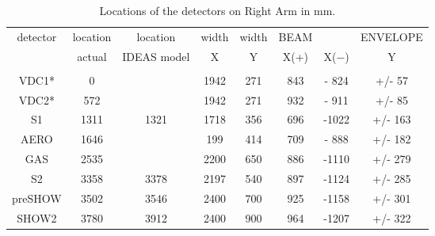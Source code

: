 \begin{table}[hptb]
\begin{center}
\begin{tabular}{cccccccc}
detector&location&  location& width &   width &      BEAM  &        & ENVELOPE \\
        & actual &IDEAS model&   X  &     Y   &      X(+)&  X($-$) &   Y\\  \hline
       &        &          &        &         &          &         &           \\  \hline    
VDC1*   &      0 &          &   1942 &    271  &     843    & - 824  & +/-  57  \\
VDC2*   &     572&          &   1942 &    271  &     932    & - 911  & +/-  85  \\
S1      &    1311&     1321 &   1718 &    356  &     696    & -1022  & +/- 163  \\ 
AERO    &    1646&          &   199  &    414  &     709    & - 888  & +/- 182  \\
GAS     &    2535&          &   2200 &    650  &     886    & -1110  & +/- 279  \\ 
S2      &    3358&     3378 &   2197 &    540  &     897    & -1124  & +/- 285  \\
preSHOW &    3502&     3546 &   2400 &    700  &     925    & -1158  & +/- 301  \\ 
SHOW2   &    3780&     3912 &   2400 &    900  &     964    & -1207  & +/- 322  \\  \hline
\end{tabular}
\end{center}
\caption[Detectors: Right ARM Detector Locations]{Locations of
the detectors on Right Arm in mm.}
\label{ta:Rdetg}
\end{table}

